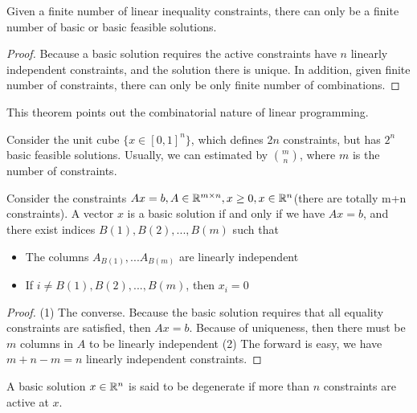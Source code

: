 \begin{refsection}
\begin{corollary}
	\cite[52]{bertsimas1997introduction} Given a finite number of linear inequality constraints, there can only be a finite number of basic or basic feasible solutions.
\end{corollary}
\begin{proof}
	Because a basic solution requires the active constraints have $n$ linearly independent constraints, and the solution there is unique. In addition, given finite number of constraints, there can only be only finite number of combinations. 
\end{proof}


\begin{remark}
	This theorem points out the combinatorial nature of linear programming.
\end{remark}

\begin{remark}
	Consider the unit cube $\{x\in [0,1]^n \}$, which defines 2$n$ constraints, but has $2^n$ basic feasible solutions. Usually, we can estimated by $\binom{m}{n}$, where $m$ is the number of constraints. 
\end{remark}


\begin{theorem}
	Consider the constraints $Ax = b, A\in \mathbb{R}^{m \times n},x\geq 0,x\in \mathbb{R}^n$(there are totally m+n constraints). A vector $x$ is a basic solution if and only if we have $Ax = b$, and there exist indices $B(1),B(2),...,B(m)$ such that
	\begin{itemize}
		\item The columns $A_{B(1)},...A_{B(m)}$ are linearly independent
		\item If $i\neq B(1),B(2),...,B(m)$, then $x_i = 0$
	\end{itemize}
\end{theorem}
\begin{proof}
	(1) The converse. Because the basic solution requires that all equality constraints are satisfied, then $Ax = b$. Because of uniqueness, then there must be $m$ columns in $A$ to be linearly independent
	(2) The forward is easy, we have $m + n- m = n$ linearly independent constraints. 
\end{proof}



\begin{definition}
	A basic solution $x\in \mathbb{R}^n$ is said to be degenerate if more than $n$ constraints are active at $x$.
\end{definition}


\end{refsection}

